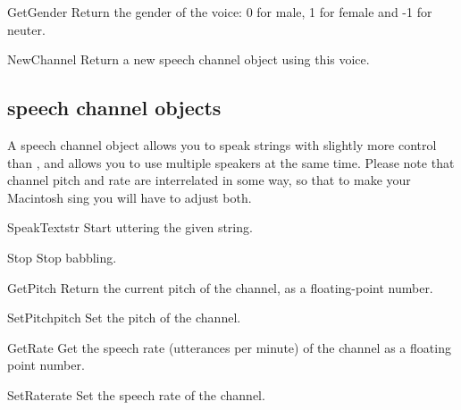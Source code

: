 
\begin{funcdesc}{GetGender}{}
Return the gender of the voice: 0 for male, 1 for female and -1 for neuter.
\end{funcdesc}

\begin{funcdesc}{NewChannel}{}
Return a new speech channel object using this voice.
\end{funcdesc}

\subsection{speech channel objects}
A speech channel object allows you to speak strings with slightly more
control than , and allows you to use multiple
speakers at the same time. Please note that channel pitch and rate are
interrelated in some way, so that to make your Macintosh sing you will
have to adjust both.

\begin{funcdesc}{SpeakText}{str}
Start uttering the given string.
\end{funcdesc}

\begin{funcdesc}{Stop}{}
Stop babbling.
\end{funcdesc}

\begin{funcdesc}{GetPitch}{}
Return the current pitch of the channel, as a floating-point number.
\end{funcdesc}

\begin{funcdesc}{SetPitch}{pitch}
Set the pitch of the channel.
\end{funcdesc}

\begin{funcdesc}{GetRate}{}
Get the speech rate (utterances per minute) of the channel as a
floating point number.
\end{funcdesc}

\begin{funcdesc}{SetRate}{rate}
Set the speech rate of the channel.
\end{funcdesc}

